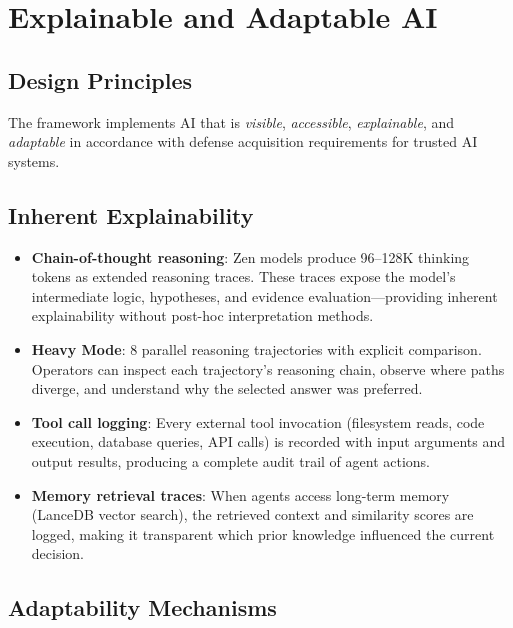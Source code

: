 \documentclass[11pt,letterpaper]{article}
\begin{document}
\section{Explainable and Adaptable AI}

\subsection{Design Principles}

The framework implements AI that is \textit{visible}, \textit{accessible}, \textit{explainable}, and \textit{adaptable} in accordance with defense acquisition requirements for trusted AI systems.

\subsection{Inherent Explainability}

\begin{itemize}
\item \textbf{Chain-of-thought reasoning}: Zen models produce 96--128K thinking tokens as extended reasoning traces. These traces expose the model's intermediate logic, hypotheses, and evidence evaluation---providing inherent explainability without post-hoc interpretation methods.
\item \textbf{Heavy Mode}: 8 parallel reasoning trajectories with explicit comparison. Operators can inspect each trajectory's reasoning chain, observe where paths diverge, and understand why the selected answer was preferred.
\item \textbf{Tool call logging}: Every external tool invocation (filesystem reads, code execution, database queries, API calls) is recorded with input arguments and output results, producing a complete audit trail of agent actions.
\item \textbf{Memory retrieval traces}: When agents access long-term memory (LanceDB vector search), the retrieved context and similarity scores are logged, making it transparent which prior knowledge influenced the current decision.
\end{itemize}

\subsection{Adaptability Mechanisms}
\end{document}
